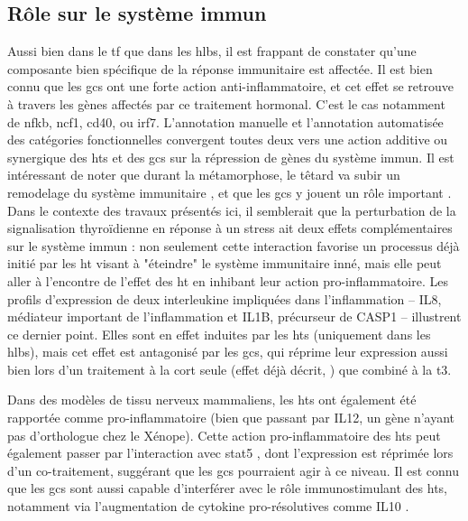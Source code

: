 \documentclass[../main.tex]{subfiles}
\begin{document}
	\subsection{Rôle sur le système immun}
		Aussi bien dans le \gls{tf} que dans les \glspl{hlb}, il est frappant de constater qu'une composante bien spécifique de la réponse immunitaire est affectée.
		Il est bien connu que les \glspl{gc} ont une forte action anti-inflammatoire, et cet effet se retrouve à travers les gènes affectés par ce traitement hormonal.
		C'est le cas notamment de \gls{nfkb}, \gls{ncf1}, \gls{cd40}, ou \gls{irf7}.
		L'annotation manuelle et l'annotation automatisée des catégories fonctionnelles convergent toutes deux vers une action additive ou synergique des \glspl{ht} et des \glspl{gc} sur la répression de gènes du système immun.
		Il est intéressant de noter que durant la métamorphose, le têtard va subir un remodelage du système immunitaire \citep{DuPasquier1989,Flajnik1987}, et que les \glspl{gc} y jouent un rôle important \citep{Rollins-Smith1997}.
		Dans le contexte des travaux présentés ici, il semblerait que la perturbation de la signalisation thyroïdienne en réponse à un stress ait deux effets complémentaires sur le système immun :
		non seulement cette interaction favorise un processus déjà initié par les \gls{ht} visant à "éteindre" le système immunitaire inné, mais elle peut aller à l'encontre de l'effet des \gls{ht} en inhibant leur action pro-inflammatoire.
		Les profils d'expression de deux interleukine impliquées dans l'inflammation – IL8, médiateur important de l'inflammation et IL1B, précurseur de CASP1 – illustrent ce dernier point.
		Elles sont en effet induites par les \glspl{ht} (uniquement dans les \glspl{hlb}), mais cet effet est antagonisé par les \glspl{gc}, qui réprime leur expression aussi bien lors d'un traitement à la \gls{cort} seule (effet déjà décrit, \citealp{Nissen2000}) que combiné à la \gls{t3}.
		\par
		Dans des modèles de tissu nerveux mammaliens, les \glspl{ht} ont également été rapportée comme pro-inflammatoire \citep{Tamura1999,Montesinos2012} (bien que passant par IL12, un gène n'ayant pas d'orthologue chez le Xénope).
		Cette action pro-inflammatoire des \glspl{ht} peut également passer par l’interaction avec \gls{stat5} \citep{Favre-Young2000}, dont l'expression est réprimée lors d'un co-traitement, suggérant que les \glspl{gc} pourraient agir à ce niveau.
		Il est connu que les \glspl{gc} sont aussi capable d'interférer avec le rôle immunostimulant des \glspl{ht}, notamment via l'augmentation de cytokine pro-résolutives comme IL10 \citep{Montesinos2012}.
\end{document}
